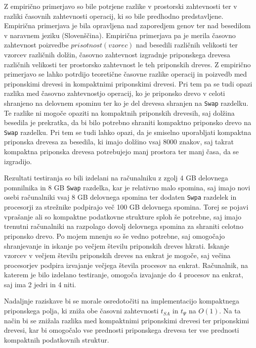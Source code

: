 Z empirično primerjavo so bile potrjene razlike v prostorski zahtevnosti ter v razliki časovnih zahtevnosti operacij, ki so bile predhodno predstavljene. Empirična primerjava je bila opravljena nad zaporedjem genov ter nad besedilom v naravnem jeziku (Slovenščina). Empirična primerjava pa je merila časovno zahtevnost poizvedbe $prisotnost(vzorec)$ nad besedili različnih velikosti ter vzorcev različnih dolžin, časovno zahtevnost izgradnje priponskega drevesa različnih velikosti ter prostorsko zahtevnost le teh priponskih dreves. Z empirično primerjavo se lahko potrdijo teoretične časovne razlike operacij in poizvedb med priponskimi drevesi in kompaktnimi priponskimi drevesi. Pri tem pa se tudi opazi razlika med časovno zahtevnostjo operacij, ko je priponsko drevo v celoti shranjeno na delovnem spominu ter ko je del drevesa shranjen na \verb|Swap| razdelku. Te razlike ni mogoče opaziti na kompaktnih priponskih drevesih, saj dolžina besedila je prekratka, da bi bilo potrebno shraniti kompaktno priponsko drevo na \verb|Swap| razdelku. Pri tem se tudi lahko opazi, da je smiselno uporabljati kompaktna priponska drevesa za besedila, ki imajo dolžino vsaj 8000 znakov, saj takrat kompaktna priponska drevesa potrebujejo manj prostora ter manj časa, da se izgradijo. 

Rezultati testiranja so bili izdelani na računalniku z zgolj 4 GB delovnega pomnilnika in 8 GB \verb|Swap| razdelka, kar je relativno malo spomina, saj imajo novi osebi računalniki vsaj 8 GB delovnega spomina ter dodaten \verb|Swpa| razdelek in procesorji za strežnike podpirajo več 100 GB delovnega spomina. Torej se pojavi vprašanje ali so kompaktne podatkovne strukture sploh še potrebne, saj imajo trenutni računalniki na razpolago dovolj delovnega spomina za shraniti celotno priponsko drevo. 
Po mojem mnenju so še vedno potrebne, saj omogočajo shranjevanje in iskanje po večjem številu priponskih dreves hkrati. Iskanje vzorcev v večjem številu priponskih dreves na enkrat je mogoče, saj večina procesorjev podpira izvajanje večjega števila procesov na enkrat. Računalnik, na katerem je bilo izdelano testiranje, omogoča izvajanje do 4 procesov na enkrat, saj ima 2 jedri in 4 niti.

Nadaljnje raziskave bi se morale osredotočiti na implementacijo kompaktnega priponskega polja, ki zniža obe časovni zahtevnosti $t_{SA}$ in $t_\Psi$ na $O(1)$. Na ta način bi se znižala razlika med kompaktnimi priponskimi drevesi ter priponskimi drevesi, kar bi omogočalo vse prednosti priponskega drevesa ter vse prednosti kompaktnih podatkovnih struktur.